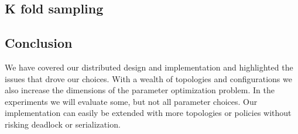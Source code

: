 \subsection{K fold sampling}
\subsection{Conclusion}
We have covered our distributed design and implementation and highlighted the issues that drove our choices. 
With a wealth of topologies and configurations we also increase the dimensions of the parameter optimization problem. In the experiments we will evaluate some, but not all parameter choices. 
Our implementation can easily be extended with more topologies or policies without risking deadlock or serialization.